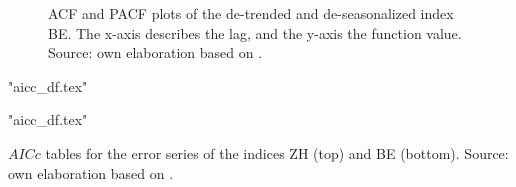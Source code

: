 \documentclass[11pt]{article}
\begin{document}
\begin{figure}[p!]
	\begin{minipage}{.5\linewidth}
		\centering
	\end{minipage}	\begin{minipage}{.5\linewidth}
		\centering
	\end{minipage}
	\caption{ACF and PACF plots of the de-trended and de-seasonalized index BE. The x-axis describes the lag, and the y-axis the function value. Source: own elaboration based on \cite{googleT}.}
	\label{fig:ACFPACF_BE}
\end{figure}
\begin{table}[p]
	\centering
	\begin{minipage}{1\linewidth}
		\centering
		{"aicc_df.tex"}
		\vspace*{0.7 cm}
	\end{minipage}
	\begin{minipage}{1\linewidth}
		\centering
		{"aicc_df.tex"}
		\vspace*{0.7 cm}
	\end{minipage}
	\caption{\(AICc\) tables for the error series of the indices ZH (top) and BE (bottom). Source: own elaboration based on \cite{googleT}.}
	\label{tab:aicc}
\end{table}
\end{document}
